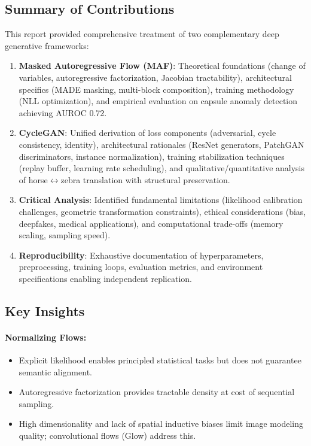 \documentclass[11pt]{article}
\begin{document}
\subsection{Summary of Contributions}
This report provided comprehensive treatment of two complementary deep generative frameworks:
\begin{enumerate}
\item \textbf{Masked Autoregressive Flow (MAF)}: Theoretical foundations (change of variables, autoregressive factorization, Jacobian tractability), architectural specifics (MADE masking, multi-block composition), training methodology (NLL optimization), and empirical evaluation on capsule anomaly detection achieving AUROC 0.72.
\item \textbf{CycleGAN}: Unified derivation of loss components (adversarial, cycle consistency, identity), architectural rationales (ResNet generators, PatchGAN discriminators, instance normalization), training stabilization techniques (replay buffer, learning rate scheduling), and qualitative/quantitative analysis of horse$\leftrightarrow$zebra translation with structural preservation.
\item \textbf{Critical Analysis}: Identified fundamental limitations (likelihood calibration challenges, geometric transformation constraints), ethical considerations (bias, deepfakes, medical applications), and computational trade-offs (memory scaling, sampling speed).
\item \textbf{Reproducibility}: Exhaustive documentation of hyperparameters, preprocessing, training loops, evaluation metrics, and environment specifications enabling independent replication.
\end{enumerate}

\subsection{Key Insights}
\paragraph{Normalizing Flows:}
\begin{itemize}
\item Explicit likelihood enables principled statistical tasks but does not guarantee semantic alignment.
\item Autoregressive factorization provides tractable density at cost of sequential sampling.
\item High dimensionality and lack of spatial inductive biases limit image modeling quality; convolutional flows (Glow) address this.
\end{itemize}
\end{document}
